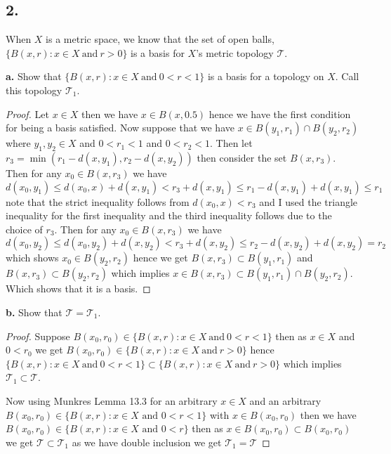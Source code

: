 \documentclass{amsart}
\theoremstyle{plain}
\theoremstyle{definition}
\theoremstyle{remark}
\begin{document}
\vspace{.15in}

\noindent
\subsection*{2.}  When $X$ is a metric space, we know that the set of open balls, $\{ B(x,r) : x\in X \ \mbox{and} \ r>0\}$ is a basis for $X$'s metric topology $\mathcal T$. 


\vspace{.1in}
{\bfseries a.} Show that $\{ B(x,r) : x\in X \ \mbox{and} \ 0<r<1\}$ is a basis for a topology on $X$. Call this topology $\mathcal T _1$. 

\begin{proof}
    Let $x\in X$ then we have $x\in B(x,0.5)$ hence we have the first condition for being a basis satisfied.  Now suppose that we have $x\in B(y_1,r_1)\cap B(y_2,r_2)$ where $y_1,y_2\in X$ and $0<r_1<1$ and $0<r_2<1$. Then let $r_3=\min(r_1-d(x,y_1),r_2-d(x,y_2))$ then consider the set $B(x,r_3)$. Then for any $x_0\in B(x,r_3)$ we have $d(x_0,y_1)\leq d(x_0,x)+d(x,y_1)< r_3+d(x,y_1)\leq r_1-d(x,y_1)+d(x,y_1)\leq r_1$ note that the strict inequality follows from $d(x_0,x)<r_3$ and I used the triangle inequality for the first inequality and the third inequality follows due to the choice of $r_3$. Then for any $x_0\in B(x,r_3)$ we have $d(x_0,y_2)\leq d(x_0,y_2)+d(x,y_2)<r_3+d(x,y_2)\leq r_2-d(x,y_2)+d(x,y_2)=r_2$ which shows $x_0\in B(y_2,r_2)$ hence we get $B(x,r_3)\subset B(y_1,r_1)$ and $B(x,r_3)\subset B(y_2,r_2)$ which implies $x\in B(x,r_3)\subset B(y_1,r_1)\cap B(y_2,r_2)$. Which shows that it is a basis. 
\end{proof}


\vspace{.1in}
{\bfseries b.} Show that $\mathcal T = \mathcal T _1$. 
\begin{proof}
    Suppose $B(x_0,r_0)\in \{ B(x,r) : x\in X \ \mbox{and} \ 0<r<1\}$ then as $x\in X$ and $0<r_0$ we get $B(x_0,r_0)\in \{ B(x,r) : x\in X \ \mbox{and} \ r>0\}$ hence $\{ B(x,r) : x\in X \ \mbox{and} \ 0<r<1\}\subset \{ B(x,r) : x\in X \ \mbox{and} \ r>0\}$ which implies $\mathcal T_1\subset \mathcal T$. 

    Now using Munkres Lemma 13.3 for an arbitrary $x\in X$ and an arbitrary $B(x_0,r_0)\in \{B(x,r): x\in X \text{ and } 0<r<1\}$ with $x\in B(x_0,r_0)$ then we have $B(x_0,r_0)\in \{B(x,r): x \in X \text{ and } 0<r\}$ then as $x\in B(x_0,r_0)\subset B(x_0,r_0)$ we get $\mathcal T\subset \mathcal T_1$ as we have double inclusion we get $\mathcal T_1 =\mathcal T$ 
\end{proof}
\end{document}
